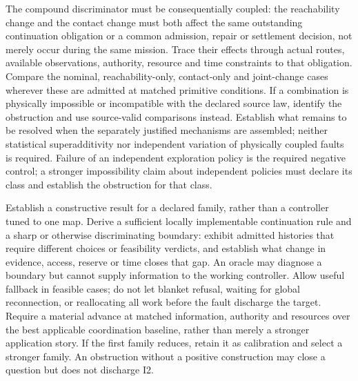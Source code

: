 \documentclass[11pt]{article}
\begin{document}
The compound discriminator must be consequentially coupled: the reachability change and the contact change must both affect the same outstanding continuation obligation or a common admission, repair or settlement decision, not merely occur during the same mission. Trace their effects through actual routes, available observations, authority, resource and time constraints to that obligation. Compare the nominal, reachability-only, contact-only and joint-change cases wherever these are admitted at matched primitive conditions. If a combination is physically impossible or incompatible with the declared source law, identify the obstruction and use source-valid comparisons instead. Establish what remains to be resolved when the separately justified mechanisms are assembled; neither statistical superadditivity nor independent variation of physically coupled faults is required. Failure of an independent exploration policy is the required negative control; a stronger impossibility claim about independent policies must declare its class and establish the obstruction for that class.

Establish a constructive result for a declared family, rather than a controller tuned to one map. Derive a sufficient locally implementable continuation rule and a sharp or otherwise discriminating boundary: exhibit admitted histories that require different choices or feasibility verdicts, and establish what change in evidence, access, reserve or time closes that gap. An oracle may diagnose a boundary but cannot supply information to the working controller. Allow useful fallback in feasible cases; do not let blanket refusal, waiting for global reconnection, or reallocating all work before the fault discharge the target. Require a material advance at matched information, authority and resources over the best applicable coordination baseline, rather than merely a stronger application story. If the first family reduces, retain it as calibration and select a stronger family. An obstruction without a positive construction may close a question but does not discharge I2.
\end{document}
